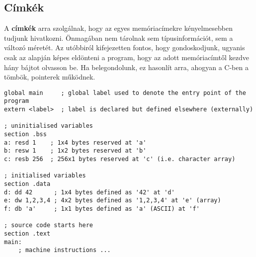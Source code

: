 \subsection{Címkék}

A \textbf{címkék} arra szolgálnak, hogy az egyes memóriacímekre kényelmesebben tudjunk hivatkozni. Önmagában nem tárolnak sem típusinformációt, sem a változó méretét. Az utóbbiról kifejezetten fontos, hogy gondoskodjunk, ugyanis csak az alapján képes eldönteni a program, hogy az adott memóriacímtől kezdve hány bájtot olvasson be. Ha belegondolunk, ez hasonlít arra, ahogyan a C-ben a tömbök, pointerek működnek.

\begin{lstlisting}[style=asmstyle, caption={Assembly program. A forráskód kiterjesztése \texttt{*.asm}}]
global main		; global label used to denote the entry point of the program
extern <label>  ; label is declared but defined elsewhere (externally)

; uninitialised variables
section .bss
a: resd 1    ; 1x4 bytes reserved at 'a'
b: resw 1    ; 1x2 bytes reserved at 'b'
c: resb 256  ; 256x1 bytes reserved at 'c' (i.e. character array)

; initialised variables
section .data
d: dd 42      ; 1x4 bytes defined as '42' at 'd'
e: dw 1,2,3,4 ; 4x2 bytes defined as '1,2,3,4' at 'e' (array)
f: db 'a'     ; 1x1 bytes defined as 'a' (ASCII) at 'f'

; source code starts here
section .text
main:
	; machine instructions ...
\end{lstlisting}

